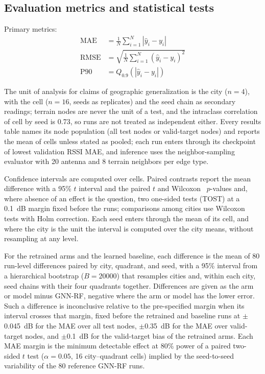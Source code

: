 \documentclass{ieeeaccess}
\begin{document}
\subsection{Evaluation metrics and statistical tests}
\label{sec:evaluation}

Primary metrics:
\begin{align}
\text{MAE} &= \frac{1}{N}\sum_{i=1}^{N} |\hat{y}_i - y_i| \label{eq:mae} \\
\text{RMSE} &= \sqrt{\frac{1}{N}\sum_{i=1}^{N} (\hat{y}_i - y_i)^2} \label{eq:rmse} \\
\text{P90} &= Q_{0.9}(|\hat{y}_i - y_i|) \label{eq:p90}
\end{align}

The unit of analysis for claims of geographic generalization is the city ($n{=}4$), with the cell ($n{=}16$, seeds as replicates) and the seed chain as secondary readings; terrain nodes are never the unit of a test, and the intraclass correlation of cell by seed is 0.73, so runs are not treated as independent either. Every results table names its node population (all test nodes or valid-target nodes) and reports the mean of cells unless stated as pooled; each run enters through its checkpoint of lowest validation RSSI MAE, and inference uses the neighbor-sampling evaluator with 20 antenna and 8 terrain neighbors per edge type.

Confidence intervals are computed over cells. Paired contrasts report the mean difference with a 95\% $t$ interval and the paired $t$ and Wilcoxon~\cite{wilcoxon1945individual,demsar2006statistical} $p$-values and, where absence of an effect is the question, two one-sided tests (TOST) at a \SI{0.1}{\deci\bel} margin fixed before the runs; comparisons among cities use Wilcoxon tests with Holm correction. Each seed enters through the mean of its cell, and where the city is the unit the interval is computed over the city means, without resampling at any level.

For the retrained arms and the learned baseline, each difference is the mean of 80 run-level differences paired by city, quadrant, and seed, with a 95\% interval from a hierarchical bootstrap ($B{=}\num{20000}$) that resamples cities and, within each city, seed chains with their four quadrants together. Differences are given as the arm or model minus GNN-RF, negative where the arm or model has the lower error. Such a difference is inconclusive relative to the pre-specified margin when its interval crosses that margin, fixed before the retrained and baseline runs at $\pm$\SI{0.045}{\deci\bel} for the MAE over all test nodes, $\pm$\SI{0.35}{\deci\bel} for the MAE over valid-target nodes, and $\pm$\SI{0.1}{\deci\bel} for the valid-target bias of the retrained arms. Each MAE margin is the minimum detectable effect at 80\% power of a paired two-sided $t$ test ($\alpha{=}0.05$, 16 city--quadrant cells) implied by the seed-to-seed variability of the 80 reference GNN-RF runs.
\end{document}
